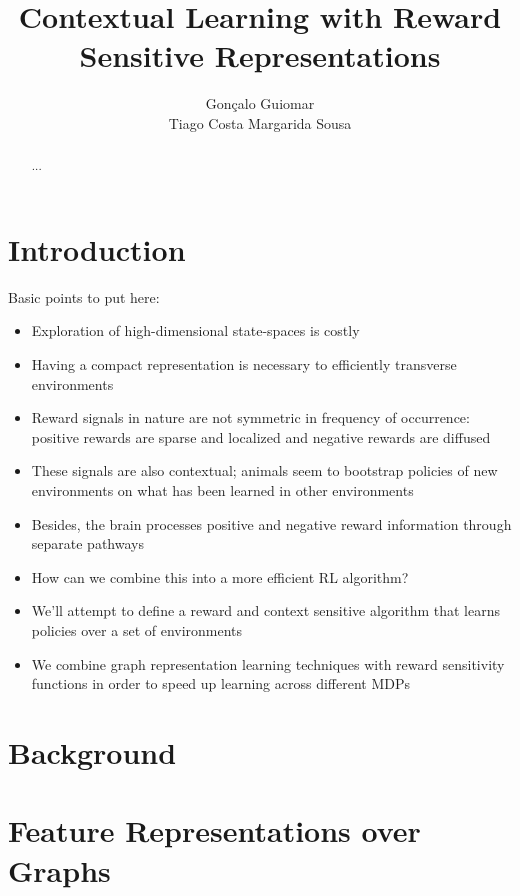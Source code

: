 \documentclass{article}
\title{Contextual Learning with Reward Sensitive Representations}
\author{
  Gonçalo Guiomar \\
  \And
  Tiago Costa
  \And
  Margarida Sousa
}
\begin{document}
\maketitle

\begin{abstract}
  ...
\end{abstract}

\section{Introduction}

Basic points to put here:

\begin{itemize}
  \item Exploration of high-dimensional state-spaces is costly
  \item Having a compact representation is necessary to efficiently transverse environments
  \item Reward signals in nature are not symmetric in frequency of occurrence: positive rewards are sparse and localized and negative rewards are diffused
  \item These signals are also contextual; animals seem to bootstrap policies of new environments on what has been learned in other environments
  \item Besides, the brain processes positive and negative reward information through separate pathways
  \item How can we combine this into a more efficient RL algorithm?
  \item We'll attempt to define a reward and context sensitive algorithm that learns policies over a set of environments
  \item We combine graph representation learning techniques with reward sensitivity functions in order to speed up learning across different MDPs
\end{itemize}

\section{Background}

\section{Feature Representations over Graphs}

\end{document}
